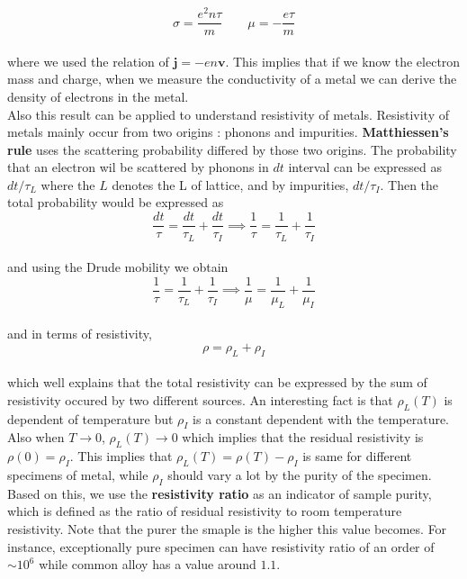 \documentclass[paper=a4, fontsize=11pt]{scrartcl}
\begin{document}
\begin{equation}\nonumber
\sigma = \frac{e^2 n \tau }{m}\qquad \mu = -\frac{e\tau}{m}
\end{equation}\\

where we used the relation of $\mathbf{j} = -en \mathbf{v}$. This implies that if we know the electron mass and charge, when we measure the conductivity of a metal we can derive the density of electrons in the metal. \\

Also this result can be applied to understand resistivity of metals. Resistivity of metals mainly occur from two origins : phonons and impurities. \textbf{Matthiessen's rule} uses the scattering probability differed by those two origins. The probability that an electron wil be scattered by phonons in $dt$ interval can be expressed as $dt/\tau_{L}$ where the $L$ denotes the L of lattice, and by impurities, $dt/\tau_{I}$. Then the total probability would be expressed as \\

\begin{equation}\nonumber
	\frac{dt}{\tau} = \frac{dt}{\tau_L} +  \frac{dt}{\tau_I} \implies 	\frac{1}{\tau} = \frac{1}{\tau_L} +  \frac{1}{\tau_I}
\end{equation}\\

and using the Drude mobility we obtain \\

\begin{equation}\nonumber
	\frac{1}{\tau} = \frac{1}{\tau_L} +  \frac{1}{\tau_I} \implies  \frac{1}{\mu} = \frac{1}{\mu_L} +  \frac{1}{\mu_I} 
\end{equation}\\

and in terms of resistivity, \\

\begin{equation}\nonumber
	\rho = \rho_L + \rho_I
\end{equation}\\

which well explains that the total resistivity can be expressed by the sum of resistivity occured by two different sources. An interesting fact is that $\rho_L(T)$ is dependent of temperature but $\rho_I$ is a constant dependent with the temperature. Also when $T\to 0$, $\rho_L(T) \to 0$ which implies that the residual resistivity is $\rho(0)= \rho_I$. This implies that $\rho_L(T) = \rho(T) - \rho_I $ is same for different specimens of metal, while $\rho_I$ should vary a lot by the purity of the specimen. Based on this, we use the \textbf{resistivity ratio} as an indicator of sample purity, which is defined as the ratio of residual resistivity to room temperature resistivity. Note that the purer the smaple is the higher this value becomes. For instance, exceptionally pure specimen can have resistivity ratio of an order of $\sim 10^6$ while common alloy has a value around $1.1$. \\
\end{document}

